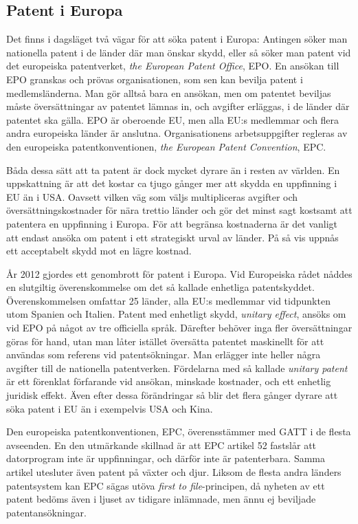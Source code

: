 \subsection{Patent i Europa}
\label{sec:eu}

Det finns i dagsläget två vägar för att söka patent i Europa:
Antingen söker man nationella patent i de länder där man önskar skydd, eller så söker man patent vid det europeiska patentverket, \emph{the European Patent Office}, EPO.
En ansökan till EPO granskas och prövas organisationen, som sen kan bevilja patent i medlemsländerna.
Man gör alltså bara en ansökan, men om patentet beviljas måste översättningar av patentet lämnas in, och avgifter erläggas, i de länder där patentet ska gälla.
EPO är oberoende EU, men alla EU:s medlemmar och flera andra europeiska länder är anslutna.
Organisationens arbetsuppgifter regleras av den europeiska patentkonventionen, \emph{the European Patent Convention}, EPC.

Båda dessa sätt att ta patent är dock mycket dyrare än i resten av världen.
En uppskattning är att det kostar ca tjugo gånger mer att skydda en uppfinning i EU än i USA.
Oavsett vilken väg som väljs multipliceras avgifter och översättningskostnader för nära trettio länder och gör det minst sagt kostsamt
att patentera en uppfinning i Europa.
För att begränsa kostnaderna är det vanligt att endast ansöka om patent i ett strategiskt urval av länder.
På så vis uppnås ett acceptabelt skydd mot en lägre kostnad.

År 2012 gjordes ett genombrott för patent i Europa.
Vid Europeiska rådet nåddes en slutgiltig överenskommelse om det så kallade enhetliga patentskyddet. 
Överenskommelsen omfattar 25 länder, alla EU:s medlemmar vid tidpunkten utom Spanien och Italien. 
Patent med enhetligt skydd, \emph{unitary effect}, ansöks om vid EPO på något av tre officiella språk.
Därefter behöver inga fler översättningar göras för hand, utan man låter istället översätta patentet maskinellt för att användas som referens vid patentsökningar.
Man erlägger inte heller några avgifter till de nationella patentverken.
Fördelarna med så kallade \emph{unitary patent} är ett förenklat förfarande vid ansökan, minskade kostnader, och ett enhetlig juridisk effekt.
Även efter dessa förändringar så blir det flera gånger dyrare att söka patent i EU än i exempelvis USA och Kina.

Den europeiska patentkonventionen, EPC, överensstämmer med GATT i de flesta avseenden.
En den utmärkande skillnad är att EPC artikel 52 fastslår att datorprogram inte är uppfinningar, och därför inte är patenterbara.
Samma artikel utesluter även patent på växter och djur.
Liksom de flesta andra länders patentsystem kan EPC sägas utöva \emph{first to file}-principen, då nyheten av ett patent bedöms även i ljuset av tidigare inlämnade, men ännu ej beviljade patentansökningar.


